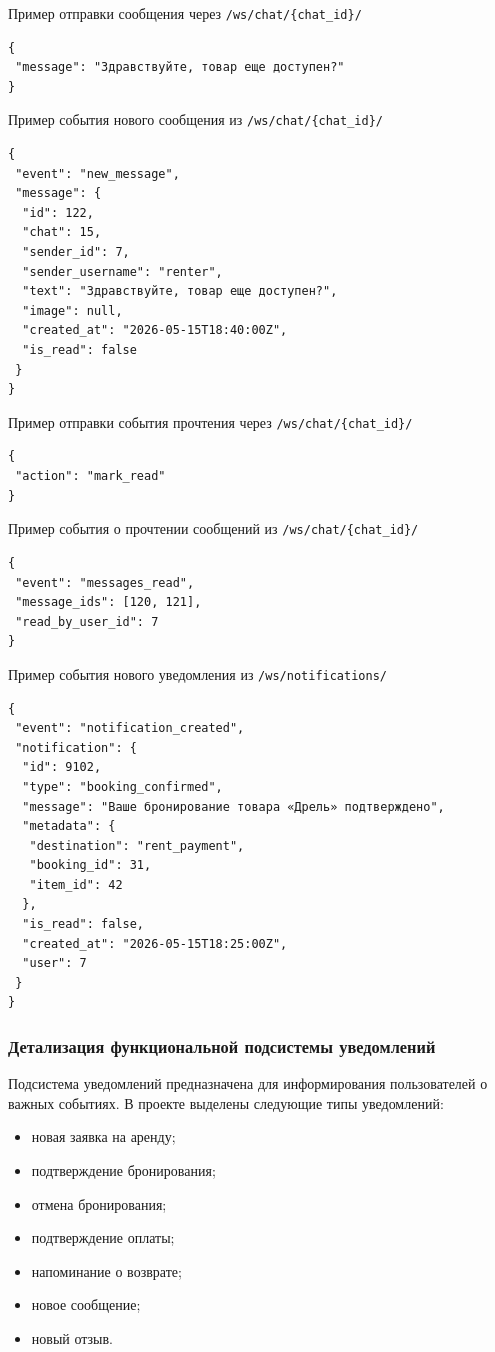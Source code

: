 \noindent Пример отправки сообщения через \verb|/ws/chat/{chat_id}/|

\begin{verbatim}
{
 "message": "Здравствуйте, товар еще доступен?"
}
\end{verbatim}

\noindent Пример события нового сообщения из \verb|/ws/chat/{chat_id}/|

\begin{verbatim}
{
 "event": "new_message",
 "message": {
  "id": 122,
  "chat": 15,
  "sender_id": 7,
  "sender_username": "renter",
  "text": "Здравствуйте, товар еще доступен?",
  "image": null,
  "created_at": "2026-05-15T18:40:00Z",
  "is_read": false
 }
}
\end{verbatim}

\noindent Пример отправки события прочтения через \verb|/ws/chat/{chat_id}/|

\begin{verbatim}
{
 "action": "mark_read"
}
\end{verbatim}

\noindent Пример события о прочтении сообщений из \verb|/ws/chat/{chat_id}/|

\begin{verbatim}
{
 "event": "messages_read",
 "message_ids": [120, 121],
 "read_by_user_id": 7
}
\end{verbatim}

\noindent Пример события нового уведомления из \verb|/ws/notifications/|

\begin{verbatim}
{
 "event": "notification_created",
 "notification": {
  "id": 9102,
  "type": "booking_confirmed",
  "message": "Ваше бронирование товара «Дрель» подтверждено",
  "metadata": {
   "destination": "rent_payment",
   "booking_id": 31,
   "item_id": 42
  },
  "is_read": false,
  "created_at": "2026-05-15T18:25:00Z",
  "user": 7
 }
}
\end{verbatim}


\subsubsection{Детализация функциональной подсистемы уведомлений}
Подсистема уведомлений предназначена для информирования пользователей о важных событиях. В проекте выделены следующие типы уведомлений:
\begin{itemize}
    \item новая заявка на аренду;
    \item подтверждение бронирования;
    \item отмена бронирования;
    \item подтверждение оплаты;
    \item напоминание о возврате;
    \item новое сообщение;
    \item новый отзыв.
\end{itemize}

